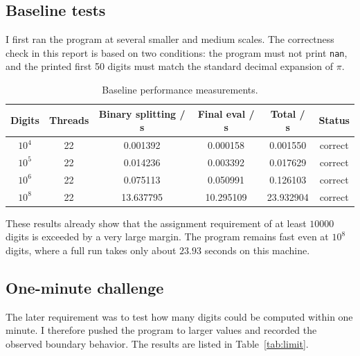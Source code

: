 \documentclass[12pt,a4paper]{article}
\begin{document}
\subsection{Baseline tests}

I first ran the program at several smaller and medium scales. The correctness check in this report is based on two conditions: the program must not print \texttt{nan}, and the printed first 50 digits must match the standard decimal expansion of $\pi$.

\begin{table}[H]
\centering
\caption{Baseline performance measurements.}
\label{tab:baseline}
\begin{tabular}{cccccc}
\toprule
Digits & Threads & Binary splitting / s & Final eval / s & Total / s & Status \\
\midrule
$10^4$ & 22 & 0.001392 & 0.000158 & 0.001550 & correct \\
$10^5$ & 22 & 0.014236 & 0.003392 & 0.017629 & correct \\
$10^6$ & 22 & 0.075113 & 0.050991 & 0.126103 & correct \\
$10^8$ & 22 & 13.637795 & 10.295109 & 23.932904 & correct \\
\bottomrule
\end{tabular}
\end{table}

These results already show that the assignment requirement of at least $10000$ digits is exceeded by a very large margin. The program remains fast even at $10^8$ digits, where a full run takes only about $23.93$ seconds on this machine.

\subsection{One-minute challenge}

The later requirement was to test how many digits could be computed within one minute. I therefore pushed the program to larger values and recorded the observed boundary behavior. The results are listed in Table~\ref{tab:limit}.
\end{document}
